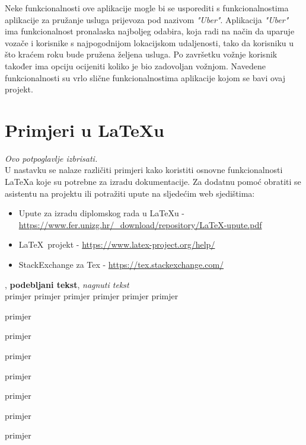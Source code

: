 		Neke funkcionalnosti ove aplikacije mogle bi se usporediti s funkcionalnostima aplikacije za pružanje usluga prijevoza pod nazivom \textit{"Uber"}. Aplikacija \textit{"Uber"} ima funkcionalnost pronalaska najboljeg odabira, koja radi na način da uparuje vozače i korisnike s najpogodnijom lokacijskom udaljenosti, tako da korisniku u što kraćem roku bude pružena željena usluga. Po završetku vožnje korisnik također ima opciju ocijeniti koliko je bio zadovoljan vožnjom. Navedene funkcionalnosti su vrlo slične funkcionalnostima aplikacije kojom se bavi ovaj projekt.
		\iffalse
		\section{Primjeri u \LaTeX u}
		
		\textit{Ovo potpoglavlje izbrisati.}\\

		U nastavku se nalaze različiti primjeri kako koristiti osnovne funkcionalnosti \LaTeX a koje su potrebne za izradu dokumentacije. Za dodatnu pomoć obratiti se asistentu na projektu ili potražiti upute na sljedećim web sjedištima:
		\begin{itemize}
			\item Upute za izradu diplomskog rada u \LaTeX u - \url{https://www.fer.unizg.hr/_download/repository/LaTeX-upute.pdf}
			\item \LaTeX\ projekt - \url{https://www.latex-project.org/help/}
			\item StackExchange za Tex - \url{https://tex.stackexchange.com/}\\
		
		\end{itemize} 	


		
		\noindent {}, \textbf{podebljani tekst}, 	\textit{nagnuti tekst}\\
		\noindent \normalsize primjer \large primjer \Large primjer \LARGE {primjer} \huge {primjer} \Huge primjer \normalsize
				
		\begin{packed_item}
			
			\item  primjer
			\item  primjer
			\item  primjer
			\item[] \begin{packed_enum}
				\item primjer
				\item[] \begin{packed_enum}
					\item[1.a] primjer
					\item[b] primjer
				\end{packed_enum}
				\item primjer
			\end{packed_enum}
			
		\end{packed_item}
		
